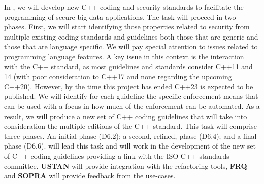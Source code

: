 \begin{Workpackage}{\thewpno}
\begin{Task}
	\TaskResults{%
	}
	\TaskHeader{}
	
	In \theTask, we will develop new C++ coding and security standards to facilitate the programming of secure big-data applications. The task will proceed in two phases. 
First, we will start identifying those properties related to security from multiple existing coding standards and guidelines both those that are generic and those that are language specific. We will pay special attention to issues related to programming language features. A key issue in this context is the interaction with the C++ standard, as most guidelines and standards consider C++11 and 14 (with poor consideration to C++17 and none regarding the upcoming C++20). However, by the time this project has ended C++23 is expected to be published.
%
We will identify for each guideline the specific enforcement means that can be used with a focus in how much of the enforcement can be automated. As a result, we will produce a new set of C++ coding guidelines that will take into consideration the multiple editions of the C++ standard.
%
This task will comprise three phases. An initial phase (D6.2); a second, refined, phase (D6.4); and a final phase (D6.6).
%
\UCM will lead this task and will work in the development of the new set of C++ coding guidelines providing a link with the ISO C++ standards committee. \textbf{USTAN} will provide integration with the refactoring tools, \textbf{FRQ} and \textbf{SOPRA} will provide feedback from the use-cases. 

\end{Task}


\end{Workpackage}
